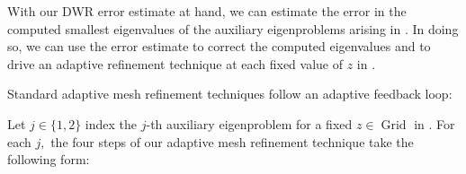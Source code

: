 With our DWR error estimate at hand, we can estimate the error in the computed smallest eigenvalues of the auxiliary eigenproblems arising in . In doing so, we can use the error estimate to correct the computed eigenvalues and to drive an adaptive refinement technique at each fixed value of $z$ in .

 Standard adaptive mesh refinement techniques follow an adaptive feedback loop:
\begin{figure}[H]
\centering
{}
\end{figure}
\noindent
Let $j \in \{1, 2\}$ index the $j$-th auxiliary eigenproblem for a fixed $z\in \operatorname{Grid}$ in . For each $j,$ the four steps of our adaptive mesh refinement technique take the following form:
